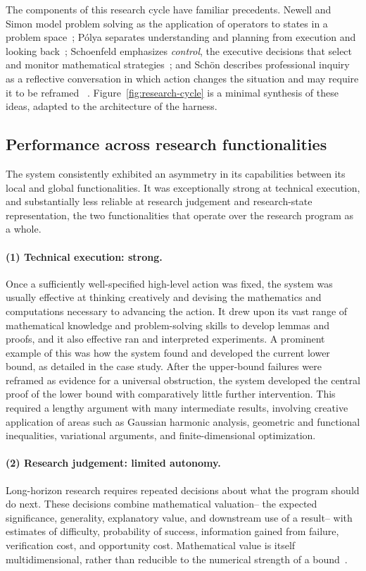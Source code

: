 The components of this research cycle have familiar precedents. Newell and Simon model problem
solving as the application of operators to states in a problem
space~\cite{newell1972human}; P\'olya separates understanding and planning
from execution and looking back~\cite{polya1957solve}; Schoenfeld emphasizes
\emph{control}, the executive decisions that select and monitor mathematical
strategies~\cite{schoenfeld1983episodes,schoenfeld1985mathematical}; and
Sch\"on describes professional inquiry as a reflective conversation in which
action changes the situation and may require it to be reframed
~\cite{schon1983reflective}. Figure~\ref{fig:research-cycle} is a minimal synthesis of these ideas, adapted to the architecture of the harness.

\subsection{Performance across research functionalities}

The system consistently exhibited an asymmetry in its capabilities between its local and global functionalities. It was exceptionally strong at
technical execution, and substantially less reliable at research judgement and research-state representation, the two functionalities that operate over the research program as a whole.

\paragraph{(1) Technical execution: strong.}
Once a sufficiently well-specified high-level action was fixed, the system was
usually effective at thinking creatively and devising the mathematics and computations necessary to advancing the action. It drew upon its vast range of
mathematical knowledge and problem-solving skills to develop lemmas and proofs, and it also effective ran and interpreted experiments. A prominent example of this was how the system found and developed the current lower bound, as detailed in the case study. After the upper-bound failures were reframed as evidence for a
universal obstruction, the system developed the central proof of the lower
bound with comparatively little further intervention. This required a lengthy argument with many intermediate results, involving creative application of areas such as Gaussian harmonic analysis, geometric and functional inequalities, variational arguments, and finite-dimensional optimization. 


\paragraph{(2) Research judgement: limited autonomy.}
Long-horizon research requires repeated decisions about what the program
should do next. These decisions combine mathematical valuation-- the
expected significance, generality, explanatory value, and downstream use of
a result-- with estimates of difficulty, probability of success, information
gained from failure, verification cost, and opportunity cost. Mathematical
value is itself multidimensional, rather than reducible to the numerical
strength of a bound~\cite{tao2007good,thurston1994proof}.

